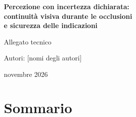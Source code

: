 
\newcommand{\autori}{[nomi degli autori]}

\begin{titlepage}
\centering
\vspace*{4cm}
{\LARGE\bfseries\color{accent} Percezione con incertezza dichiarata:\\[4pt] continuità visiva durante le occlusioni\\[4pt] e sicurezza delle indicazioni\par}
\vspace{1.2cm}
{\Large Allegato tecnico\par}
\vspace{2.5cm}
{\large Autori: \autori\par}
\vspace{0.8cm}
{\large novembre 2026\par}
\vfill
\end{titlepage}

\section*{Sommario}


\tableofcontents
\clearpage

\clearpage









\clearpage
\appendix


\clearpage
\begingroup\sloppy\def\UrlBreaks{\do\/\do\-\do\_\do\.}


\endgroup

